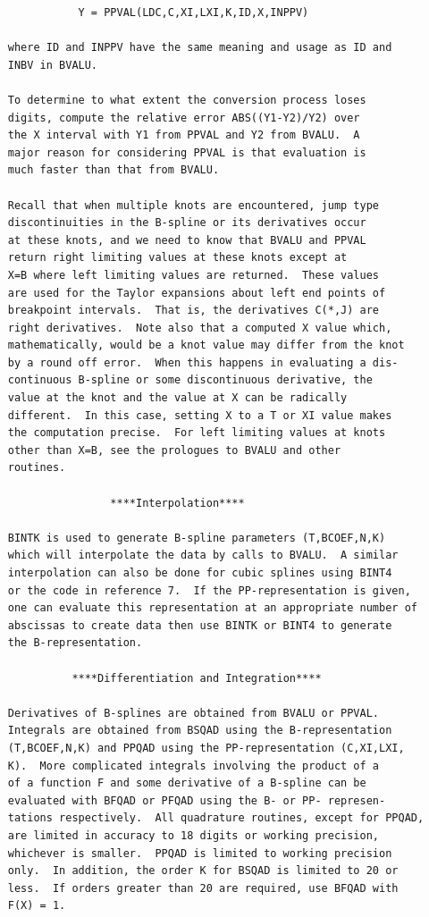 \documentclass[11pt,twoside]{article}
\begin{document}
\begin{verbatim}
                Y = PPVAL(LDC,C,XI,LXI,K,ID,X,INPPV)

     where ID and INPPV have the same meaning and usage as ID and
     INBV in BVALU.

     To determine to what extent the conversion process loses
     digits, compute the relative error ABS((Y1-Y2)/Y2) over
     the X interval with Y1 from PPVAL and Y2 from BVALU.  A
     major reason for considering PPVAL is that evaluation is
     much faster than that from BVALU.

     Recall that when multiple knots are encountered, jump type
     discontinuities in the B-spline or its derivatives occur
     at these knots, and we need to know that BVALU and PPVAL
     return right limiting values at these knots except at
     X=B where left limiting values are returned.  These values
     are used for the Taylor expansions about left end points of
     breakpoint intervals.  That is, the derivatives C(*,J) are
     right derivatives.  Note also that a computed X value which,
     mathematically, would be a knot value may differ from the knot
     by a round off error.  When this happens in evaluating a dis-
     continuous B-spline or some discontinuous derivative, the
     value at the knot and the value at X can be radically
     different.  In this case, setting X to a T or XI value makes
     the computation precise.  For left limiting values at knots
     other than X=B, see the prologues to BVALU and other
     routines.

                     ****Interpolation****

     BINTK is used to generate B-spline parameters (T,BCOEF,N,K)
     which will interpolate the data by calls to BVALU.  A similar
     interpolation can also be done for cubic splines using BINT4
     or the code in reference 7.  If the PP-representation is given,
     one can evaluate this representation at an appropriate number of
     abscissas to create data then use BINTK or BINT4 to generate
     the B-representation.

               ****Differentiation and Integration****

     Derivatives of B-splines are obtained from BVALU or PPVAL.
     Integrals are obtained from BSQAD using the B-representation
     (T,BCOEF,N,K) and PPQAD using the PP-representation (C,XI,LXI,
     K).  More complicated integrals involving the product of a
     of a function F and some derivative of a B-spline can be
     evaluated with BFQAD or PFQAD using the B- or PP- represen-
     tations respectively.  All quadrature routines, except for PPQAD,
     are limited in accuracy to 18 digits or working precision,
     whichever is smaller.  PPQAD is limited to working precision
     only.  In addition, the order K for BSQAD is limited to 20 or
     less.  If orders greater than 20 are required, use BFQAD with
     F(X) = 1.


\end{verbatim}
\end{document}
